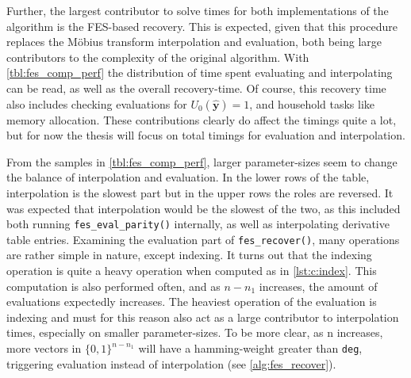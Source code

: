 Further, the largest contributor to solve times for both implementations of the algorithm is the FES-based recovery. This is expected, given that this procedure replaces the Möbius transform interpolation and evaluation, both being large contributors to the complexity of the original algorithm. With \cref{tbl:fes_comp_perf} the distribution of time spent evaluating and interpolating can be read, as well as the overall recovery-time. Of course, this recovery time also includes checking evaluations for $U_0(\hat{\mathbf{y}}) = 1$, and household tasks like memory allocation. These contributions clearly do affect the timings quite a lot, but for now the thesis will focus on total timings for evaluation and interpolation.

From the samples in \cref{tbl:fes_comp_perf}, larger parameter-sizes seem to change the balance of interpolation and evaluation. In the lower rows of the table, interpolation is the slowest part but in the upper rows the roles are reversed. It was expected that interpolation would be the slowest of the two, as this included both running \texttt{fes\_eval\_parity()} internally, as well as interpolating derivative table entries. Examining the evaluation part of \texttt{fes\_recover()}, many operations are rather simple in nature, except indexing. It turns out that the indexing operation is quite a heavy operation when computed as in \cref{lst:c:index}. This computation is also performed often, and as $n - n_1$ increases, the amount of evaluations expectedly increases. The heaviest operation of the evaluation is indexing and must for this reason also act as a large contributor to interpolation times, especially on smaller parameter-sizes. To be more clear, as n increases, more vectors in $\{0,1\}^{n - n_1}$ will have a hamming-weight greater than \texttt{deg}, triggering evaluation instead of interpolation (see \cref{alg:fes_recover}).
